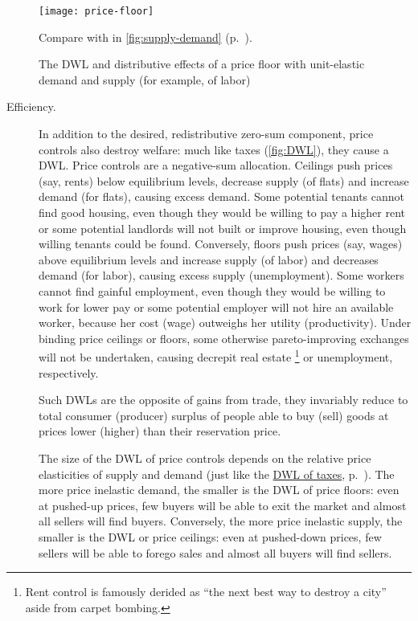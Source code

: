 \begin{figure}[htbp]
	\begin{center}
	\texttt{[image: price-floor]}
	\caption[Efficiency and Equity of a Price Floor]{The \gls{DWL} and distributive effects of a price floor with unit-elastic demand and supply (for example, of labor)}
	\end{center}
	\scriptsize{Compare with  in \autoref{fig:supply-demand} (p.~\pageref{fig:supply-demand}).}
	\label{fig:price-floor}
\end{figure}

\begin{description}
	\item[Efficiency.]
	In addition to the desired, redistributive zero-sum component, price controls also destroy welfare:
	much like taxes (\autoref{fig:DWL}), they cause a \gls{DWL}.
	Price controls are a negative-sum allocation.
	Ceilings push prices (say, rents) below equilibrium levels, decrease supply (of flats) and increase demand (for flats), causing excess demand.
	Some potential tenants cannot find good housing, even though they would be willing to pay a higher rent or some potential landlords will not built or improve housing, even though willing tenants could be found.
	Conversely, floors push prices (say, wages) above equilibrium levels and increase supply (of labor) and decreases demand (for labor), causing excess supply (unemployment).
	Some workers cannot find gainful employment, even though they would be willing to work for lower pay or some potential employer will not hire an available worker, because her cost (wage) outweighs her utility (productivity).
	Under binding price ceilings or floors, some otherwise pareto-improving exchanges will not be undertaken, causing decrepit real estate
	\footnote{
		Rent control is famously derided as ``the next best way to destroy a city'' aside from carpet bombing.
	}
	or unemployment, respectively.

	Such \glspl{DWL} are the opposite of gains from trade, they invariably reduce to total consumer (producer) surplus of people able to buy (sell) goods at prices lower (higher) than their reservation price.

	The size of the \gls{DWL} of price controls depends on the relative price elasticities of supply and demand (just like the \hyperref[sec:minimal-DWL]{\gls{DWL} of taxes}, p.~\pageref{sec:minimal-DWL}).
	The more price inelastic demand, the smaller is the \gls{DWL} of price floors:
	even at pushed-up prices, few buyers will be able to exit the market and almost all sellers will find buyers.
	Conversely, the more price inelastic supply, the smaller is the \gls{DWL} or price ceilings:
	even at pushed-down prices, few sellers will be able to forego sales and almost all buyers will find sellers.


\end{description}
